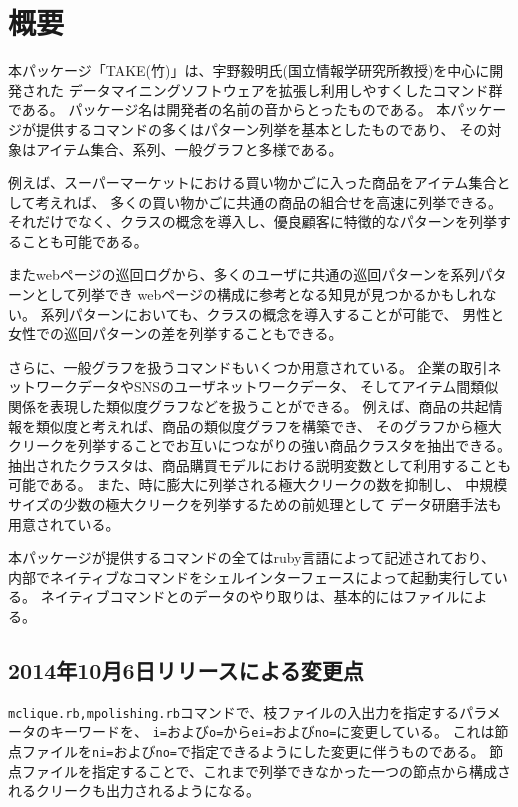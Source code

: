 

\section{概要}
本パッケージ「TAKE(竹)」は、宇野毅明氏(国立情報学研究所教授)を中心に開発された
データマイニングソフトウェア\cite{UnoWeb}を拡張し利用しやすくしたコマンド群である。
パッケージ名は開発者の名前の音からとったものである。
本パッケージが提供するコマンドの多くはパターン列挙を基本としたものであり、
その対象はアイテム集合、系列、一般グラフと多様である。

例えば、スーパーマーケットにおける買い物かごに入った商品をアイテム集合として考えれば、
多くの買い物かごに共通の商品の組合せを高速に列挙できる。
それだけでなく、クラスの概念を導入し、優良顧客に特徴的なパターンを列挙することも可能である。

またwebページの巡回ログから、多くのユーザに共通の巡回パターンを系列パターンとして列挙でき
webページの構成に参考となる知見が見つかるかもしれない。
系列パターンにおいても、クラスの概念を導入することが可能で、
男性と女性での巡回パターンの差を列挙することもできる。

さらに、一般グラフを扱うコマンドもいくつか用意されている。
企業の取引ネットワークデータやSNSのユーザネットワークデータ、
そしてアイテム間類似関係を表現した類似度グラフなどを扱うことができる。
例えば、商品の共起情報を類似度と考えれば、商品の類似度グラフを構築でき、
そのグラフから極大クリークを列挙することでお互いにつながりの強い商品クラスタを抽出できる。
抽出されたクラスタは、商品購買モデルにおける説明変数として利用することも可能である。
また、時に膨大に列挙される極大クリークの数を抑制し、
中規模サイズの少数の極大クリークを列挙するための前処理として
データ研磨手法も用意されている。

本パッケージが提供するコマンドの全てはruby言語によって記述されており、
内部でネイティブなコマンドをシェルインターフェースによって起動実行している。
ネイティブコマンドとのデータのやり取りは、基本的にはファイルによる。

\subsection{2014年10月6日リリースによる変更点}
\verb|mclique.rb,mpolishing.rb|コマンドで、枝ファイルの入出力を指定するパラメータのキーワードを、
\verb|i=|および\verb|o=|から\verb|ei=|および\verb|no=|に変更している。
これは節点ファイルを\verb|ni=|および\verb|no=|で指定できるようにした変更に伴うものである。
節点ファイルを指定することで、これまで列挙できなかった一つの節点から構成されるクリークも出力されるようになる。

